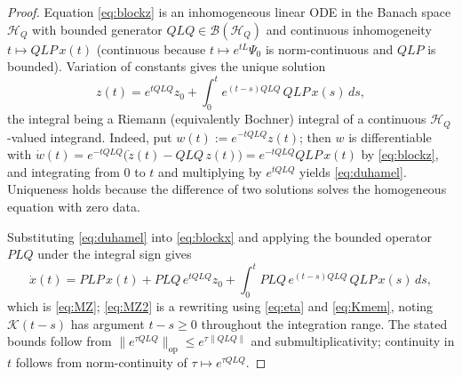 \documentclass[11pt,reqno]{amsart}
\numberwithin{equation}{section}
\theoremstyle{plain}
\theoremstyle{definition}
\theoremstyle{remark}
\newcommand{\HQ}{\mathcal{H}_{Q}}
\newcommand{\Kmem}{\mathcal{K}}
\begin{document}
\begin{proof}
Equation \eqref{eq:blockz} is an inhomogeneous linear ODE in the Banach space $\HQ$ with
bounded generator $QLQ\in\mathcal{B}(\HQ)$ and continuous inhomogeneity
$t\mapsto QLP\,x(t)$ (continuous because $t\mapsto e^{tL}\Psi_{0}$ is norm-continuous and
$QLP$ is bounded). Variation of constants gives the unique solution
\begin{equation}
\label{eq:duhamel}
z(t)=e^{tQLQ}z_{0}+\int_{0}^{t}e^{(t-s)QLQ}\,QLP\,x(s)\,ds ,
\end{equation}
the integral being a Riemann (equivalently Bochner) integral of a continuous $\HQ$-valued
integrand. Indeed, put $w(t):=e^{-tQLQ}z(t)$; then $w$ is differentiable with
$\dot w(t)=e^{-tQLQ}\bigl(\dot z(t)-QLQ\,z(t)\bigr)=e^{-tQLQ}QLP\,x(t)$ by \eqref{eq:blockz},
and integrating from $0$ to $t$ and multiplying by $e^{tQLQ}$ yields \eqref{eq:duhamel}.
Uniqueness holds because the difference of two solutions solves the homogeneous equation
with zero data.

Substituting \eqref{eq:duhamel} into \eqref{eq:blockx} and applying the bounded operator
$PLQ$ under the integral sign gives
\[
\dot x(t)
=PLP\,x(t)
+PLQ\,e^{tQLQ}z_{0}
+\int_{0}^{t}PLQ\,e^{(t-s)QLQ}\,QLP\,x(s)\,ds ,
\]
which is \eqref{eq:MZ}; \eqref{eq:MZ2} is a rewriting using \eqref{eq:eta} and
\eqref{eq:Kmem}, noting $\Kmem(t-s)$ has argument $t-s\ge0$ throughout the integration
range. The stated bounds follow from
$\lVert e^{\tau QLQ}\rVert_{\mathrm{op}}\le e^{\tau\lVert QLQ\rVert}$ and submultiplicativity;
continuity in $t$ follows from norm-continuity of $\tau\mapsto e^{\tau QLQ}$.
\end{proof}
\end{document}
